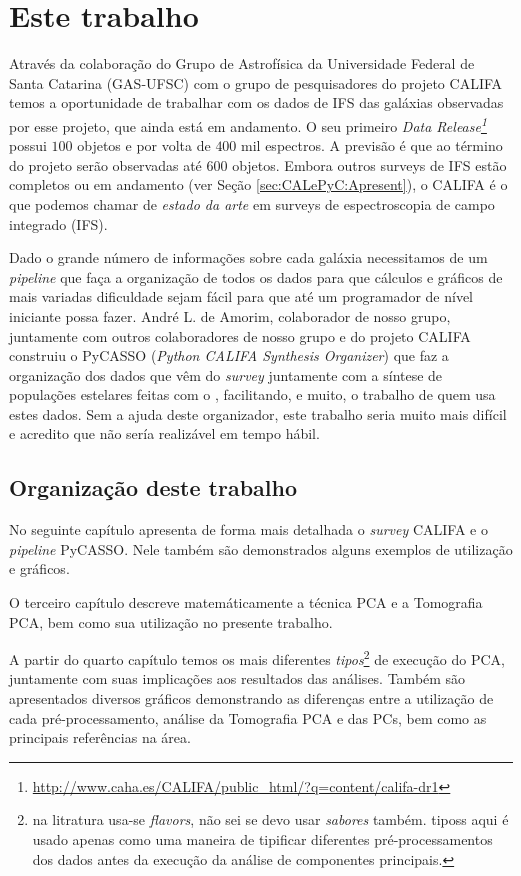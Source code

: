 \section{Este trabalho}
\label{sec:Intro:ThisWork}

Através da colaboração do Grupo de Astrofísica da Universidade Federal de Santa
Catarina (GAS-UFSC) com o grupo de pesquisadores do projeto CALIFA temos a
oportunidade de trabalhar com os dados de IFS das galáxias observadas por esse
projeto, que ainda está em andamento. O seu primeiro {\em Data
Release\footnote{\url{http://www.caha.es/CALIFA/public_html/?q=content/califa-dr1}}}
\citep[][DR1]{Husemann2013} possui $100$ objetos e por volta de $400$ mil
espectros. A previsão é que ao término do projeto serão observadas até $600$
objetos. Embora outros surveys de IFS estão completos ou em andamento (ver Seção
\ref{sec:CALePyC:Apresent}), o CALIFA é o que podemos chamar de {\em estado da
arte} em surveys de espectroscopia de campo integrado (IFS).

Dado o grande número de informações sobre cada galáxia necessitamos de um {\em
pipeline} que faça a organização de todos os dados para que cálculos e gráficos
de mais variadas dificuldade sejam fácil para que até um programador de nível
iniciante possa fazer. André L. de Amorim, colaborador de nosso grupo,
juntamente com outros colaboradores de nosso grupo e do projeto CALIFA construiu
o PyCASSO ({\em Python CALIFA \starlight Synthesis Organizer})
\citep[][ cap. 4]{CidFernandes2013I} que faz a organização dos dados que vêm
do {\em survey} juntamente com a síntese de populações estelares feitas com o
\starlight, facilitando, e muito, o trabalho de quem usa estes dados. Sem a
ajuda deste organizador, este trabalho seria muito mais difícil e acredito que
não sería realizável em tempo hábil.

\subsection{Organização deste trabalho}

No seguinte capítulo apresenta de forma mais detalhada o {\em survey} CALIFA e o
{\em pipeline} PyCASSO. Nele também são demonstrados alguns exemplos de
utilização e gráficos.

O terceiro capítulo descreve matemáticamente a técnica PCA e a Tomografia PCA,
bem como sua utilização no presente trabalho. 

A partir do quarto capítulo temos os mais diferentes {\em tipos}\footnote{\ojo
na litratura usa-se {\em flavors}, não sei se devo usar {\em sabores} também.
tiposs aqui é usado apenas como uma maneira de tipificar diferentes
pré-processamentos dos dados antes da execução da análise de componentes
principais.} de execução do PCA, juntamente com suas implicações aos resultados
das análises. Também são apresentados diversos gráficos demonstrando as
diferenças entre a utilização de cada pré-processamento, análise da
Tomografia PCA e das PCs, bem como as principais referências na área.

